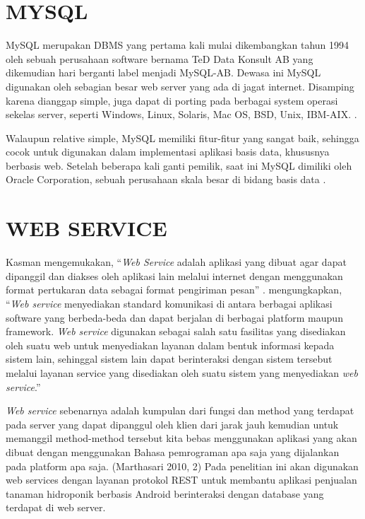 \section{\uppercase{MySQL}}
MySQL merupakan DBMS yang pertama kali mulai dikembangkan tahun 1994 oleh sebuah perusahaan software bernama TeD Data Konsult AB yang dikemudian hari berganti label menjadi MySQL-AB. Dewasa ini MySQL digunakan oleh sebagian besar web server yang ada di jagat internet. Disamping karena dianggap simple, juga dapat di porting pada berbagai system operasi sekelas server, seperti Windows, Linux, Solaris, Mac OS, BSD, Unix, IBM-AIX. \citep{fathansyah2012}.

\par Walaupun relative simple, MySQL memiliki fitur-fitur yang sangat baik, sehingga cocok untuk digunakan dalam implementasi aplikasi basis data, khususnya berbasis web. Setelah beberapa kali ganti pemilik, saat ini MySQL dimiliki oleh Oracle Corporation, sebuah perusahaan skala besar di bidang basis data \citep{fathansyah2012}.

\section{\uppercase{Web Service}}
Kasman mengemukakan, “\textit{Web Service} adalah aplikasi yang dibuat agar dapat dipanggil dan diakses oleh aplikasi lain melalui internet dengan menggunakan format pertukaran data sebagai format pengiriman pesan” \citep{kasman2015}. \cite{hartono2012pengaruh} mengungkapkan, “\textit{Web service} menyediakan standard komunikasi di antara berbagai aplikasi software yang berbeda-beda dan dapat berjalan di berbagai platform maupun framework. \textit{Web service} digunakan sebagai salah satu fasilitas yang disediakan oleh suatu web untuk menyediakan layanan dalam bentuk informasi kepada sistem lain, sehinggal sistem lain dapat berinteraksi dengan sistem tersebut melalui layanan service yang disediakan oleh suatu sistem yang menyediakan \textit{web service}.” 

\par \textit{Web service} sebenarnya adalah kumpulan dari fungsi dan method yang terdapat pada server yang dapat dipanggul oleh klien dari jarak jauh kemudian untuk memanggil method-method tersebut kita bebas menggunakan aplikasi yang akan dibuat dengan menggunakan Bahasa pemrograman apa saja yang dijalankan pada platform apa saja. (Marthasari 2010, 2) Pada penelitian ini akan digunakan web services dengan layanan protokol REST untuk membantu aplikasi penjualan tanaman hidroponik berbasis Android berinteraksi dengan database yang terdapat di web server.

